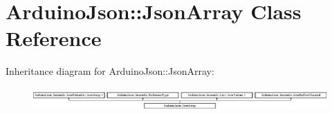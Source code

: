 \hypertarget{class_arduino_json_1_1_json_array}{}\section{Arduino\+Json\+:\+:Json\+Array Class Reference}
\label{class_arduino_json_1_1_json_array}
Inheritance diagram for Arduino\+Json\+:\+:Json\+Array\+:\begin{figure}[H]
\begin{center}
\leavevmode
\includegraphics[height=0.894569cm]{class_arduino_json_1_1_json_array}
\end{center}
\end{figure}
